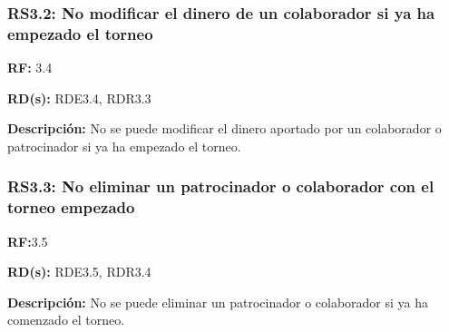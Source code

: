 \subsubsection{RS3.2: No modificar el dinero de un colaborador si ya ha empezado el torneo}
\textbf{RF:} 3.4

\textbf{RD(s):} RDE3.4, RDR3.3

\textbf{Descripción:} No se puede modificar el dinero aportado por un colaborador o patrocinador si ya ha empezado el torneo.

\subsubsection{RS3.3: No eliminar un patrocinador o colaborador con el torneo empezado}
\textbf{RF:}3.5

\textbf{RD(s): }RDE3.5, RDR3.4

\textbf{Descripción:} No se puede eliminar un patrocinador o colaborador si ya ha comenzado el torneo.

\pagebreak
